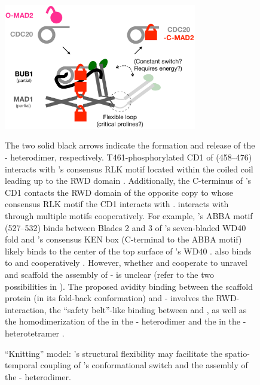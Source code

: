 \begin{figure}
    \centering
    \includegraphics[width=0.75\textwidth]{chapters/figures/KnittingModel.pdf}
    \caption{``Knitting'' model: 's structural flexibility may facilitate the spatio-temporal coupling of 's conformational switch and the assembly of the - heterodimer.}
    \noindent\justifying The two solid black arrows indicate the formation and release of the - heterodimer, respectively. T461-phosphorylated CD1 of  (458--476) interacts with 's consensus RLK motif located within the coiled coil leading up to the RWD domain \cite{Ji2017eLife, BUB1CD1-MAD1CStructure}. Additionally, the C-terminus of 's CD1 contacts the RWD domain of the opposite  copy to whose consensus RLK motif the CD1 interacts with \cite{BUB1CD1-MAD1CStructure}.  interacts with  through multiple motifs cooperatively. For example, 's ABBA motif (527--532) binds between Blades 2 and 3 of 's seven-bladed WD40 fold and 's consensus KEN box (C-terminal to the ABBA motif) likely binds to the center of the top surface of 's WD40 \cite{BUB1-CDC20-MAD1, CDC20-KEN, ABBA}.  also binds to  and  cooperatively \cite{BUB1-CDC20-MAD1, Tripartite}. However, whether  and  cooperate to unravel  and scaffold the assembly of - is unclear (refer to the two possibilities in ). The proposed avidity binding between the scaffold protein  (in its fold-back conformation) and - involves the RWD- interaction, the ``safety belt''-like binding between  and , as well as the homodimerization of the  in the - heterodimer and the  in the - heterotetramer \cite{TemplateModel, Structure1GO4, beta5-alphaCLoop, I-MAD2, Ji2017eLife, BUB1-CDC20-MAD1}.
    \label{KnittingModel}
\end{figure}

